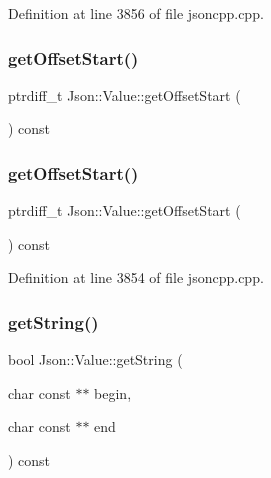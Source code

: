 Definition at line 3856 of file jsoncpp.\+cpp.

\hypertarget{class_json_1_1_value_afa081dc764000951a1d8d6148155508e}{}\label{class_json_1_1_value_afa081dc764000951a1d8d6148155508e} 
\subsubsection{\texorpdfstring{get\+Offset\+Start()}{getOffsetStart()}\hspace{0.1cm}{\footnotesize\ttfamily [1/2]}}
{\footnotesize\ttfamily ptrdiff\+\_\+t Json\+::\+Value\+::get\+Offset\+Start (\begin{DoxyParamCaption}{ }\end{DoxyParamCaption}) const}

\hypertarget{class_json_1_1_value_afa081dc764000951a1d8d6148155508e}{}\label{class_json_1_1_value_afa081dc764000951a1d8d6148155508e} 
\subsubsection{\texorpdfstring{get\+Offset\+Start()}{getOffsetStart()}\hspace{0.1cm}{\footnotesize\ttfamily [2/2]}}
{\footnotesize\ttfamily ptrdiff\+\_\+t Json\+::\+Value\+::get\+Offset\+Start (\begin{DoxyParamCaption}{ }\end{DoxyParamCaption}) const}



Definition at line 3854 of file jsoncpp.\+cpp.

\hypertarget{class_json_1_1_value_a2e1b7be6bde2fe23f15290d9ddbbdf8a}{}\label{class_json_1_1_value_a2e1b7be6bde2fe23f15290d9ddbbdf8a} 
\subsubsection{\texorpdfstring{get\+String()}{getString()}\hspace{0.1cm}{\footnotesize\ttfamily [1/2]}}
{\footnotesize\ttfamily bool Json\+::\+Value\+::get\+String (\begin{DoxyParamCaption}\item[{char const $\ast$$\ast$}]{begin,  }\item[{char const $\ast$$\ast$}]{end }\end{DoxyParamCaption}) const}

